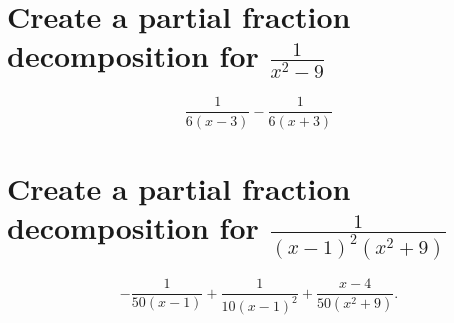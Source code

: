 \documentclass[a4paper]{article}
\title{Quiz #5}
\author{yawnbo}
\date{\today}
\begin{document}
\section{Create a partial fraction decomposition for $\frac{1}{x^2-9}$}%
\label{sec:Question 1}

\[
\frac{1}{6\left( x-3 \right) } - \frac{1}{6\left( x+3 \right) }
\] 

\section{Create a partial fraction decomposition for $\frac{1}{\left( x-1 \right) ^2\left( x^2+9 \right) }$}%
\[
  -\frac{1}{50\left( x-1 \right) }+\frac{1}{10\left( x-1 \right) ^2}+ \frac{x-4}{50\left( x^2+9 \right) }
.\] 
\end{document}
